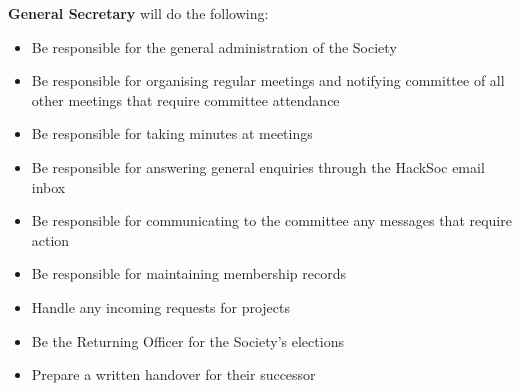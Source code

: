\item \textbf{General Secretary} will do the following:
\begin{itemize}
  \item Be responsible for the general administration of the Society
  \item Be responsible for organising regular meetings and notifying committee of all other meetings that require committee attendance
  \item Be responsible for taking minutes at meetings
  \item Be responsible for answering general enquiries through the HackSoc email inbox
  \item Be responsible for communicating to the committee any messages that require action
  \item Be responsible for maintaining membership records
  \item Handle any incoming requests for projects
  \item Be the Returning Officer for the Society's elections
  \item Prepare a written handover for their successor
\end{itemize}